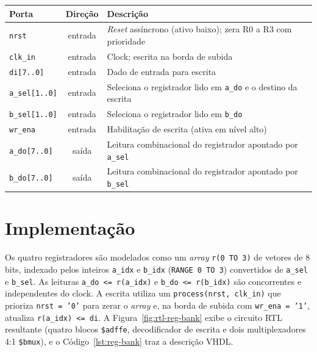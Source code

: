 \documentclass[
	12pt,				%
	oneside,			%
	a4paper,			%
	sumario = tradicional,
	english,			%
	brazilian			%
	]{abntex2}
\begin{document}
\begin{quadro}[!htb]
  \SingleSpacing
  \caption{Portas do banco de registradores.}
  \label{quad:portas-reg-bank}
  \centering
  \begin{tabular}{lcp{9cm}}
    \hline
    Porta & Direção & Descrição \\ \hline
    \texttt{nrst} & entrada & \textit{Reset} assíncrono (ativo baixo); zera R0 a R3 com prioridade \\
    \texttt{clk\_in} & entrada & Clock; escrita na borda de subida \\
    \texttt{di[7..0]} & entrada & Dado de entrada para escrita \\
    \texttt{a\_sel[1..0]} & entrada & Seleciona o registrador lido em \texttt{a\_do} e o destino da escrita \\
    \texttt{b\_sel[1..0]} & entrada & Seleciona o registrador lido em \texttt{b\_do} \\
    \texttt{wr\_ena} & entrada & Habilitação de escrita (ativa em nível alto) \\
    \texttt{a\_do[7..0]} & saída & Leitura combinacional do registrador apontado por \texttt{a\_sel} \\
    \texttt{b\_do[7..0]} & saída & Leitura combinacional do registrador apontado por \texttt{b\_sel} \\ \hline
  \end{tabular}
\end{quadro}

\section{Implementação}

Os quatro registradores são modelados como um \textit{array} \texttt{r(0 TO 3)} de vetores de 8 bits, indexado pelos inteiros \texttt{a\_idx} e \texttt{b\_idx} (\texttt{RANGE 0 TO 3}) convertidos de \texttt{a\_sel} e \texttt{b\_sel}. As leituras \texttt{a\_do <= r(a\_idx)} e \texttt{b\_do <= r(b\_idx)} são concorrentes e independentes do clock. A escrita utiliza um \texttt{process(nrst, clk\_in)} que prioriza \texttt{nrst = '0'} para zerar o \textit{array} e, na borda de subida com \texttt{wr\_ena = '1'}, atualiza \texttt{r(a\_idx) <= di}. A Figura~\ref{fig:rtl-reg-bank} exibe o circuito RTL resultante (quatro blocos \texttt{\$adffe}, decodificador de escrita e dois multiplexadores 4:1 \texttt{\$bmux}), e o Código~\ref{lst:reg-bank} traz a descrição VHDL.
\end{document}
